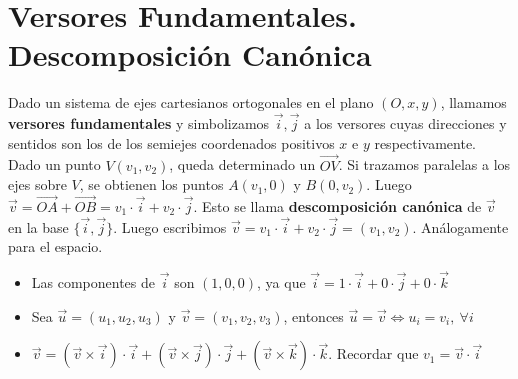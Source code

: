 \documentclass[11pt,a4paper]{article}
\begin{document}
\section{Versores Fundamentales. Descomposici\'on Can\'onica}
\noindent Dado un sistema de ejes cartesianos ortogonales en el plano $(O,x,y)$, llamamos \textbf{versores fundamentales} y simbolizamos $\overrightarrow{i}, \overrightarrow{j}$ a los versores cuyas direcciones y sentidos son los de los semiejes coordenados positivos $x$ e $y$ respectivamente. Dado un punto $V(v_1, v_2)$, queda determinado un $\overrightarrow{OV}$. Si trazamos paralelas a los ejes sobre $V$, se obtienen los puntos $A(v_1, 0)$ y $B(0,v_2)$. Luego $\overrightarrow{v}=\overrightarrow{OA} + \overrightarrow{OB} = v_1 \cdot \overrightarrow{i} + v_2 \cdot \overrightarrow{j}$. Esto se llama \textbf{descomposici\'on can\'onica} de $\overrightarrow{v}$ en la base $\{\overrightarrow{i}, \overrightarrow{j}\}$. Luego escribimos $\overrightarrow{v} = v_1 \cdot \overrightarrow{i} + v_2 \cdot \overrightarrow{j} = (v_1, v_2)$. An\'alogamente para el espacio.
\begin{itemize}
\item Las componentes de $\overrightarrow{i}$ son $(1,0,0)$, ya que $\overrightarrow{i} = 1 \cdot \overrightarrow{i} + 0 \cdot \overrightarrow{j} + 0 \cdot \overrightarrow{k}$
\item Sea $\overrightarrow{u} = (u_1,u_2,u_3)$ y $\overrightarrow{v}=(v_1,v_2,v_3)$, entonces $\overrightarrow{u} = \overrightarrow{v} \iff u_i = v_i,\ \forall i$
\item $\overrightarrow{v} = (\overrightarrow{v}\times\overrightarrow{i}) \cdot \overrightarrow{i} + (\overrightarrow{v}\times\overrightarrow{j})\cdot\overrightarrow{j} + (\overrightarrow{v}\times\overrightarrow{k})\cdot \overrightarrow{k}$. Recordar que $v_1 = \overrightarrow{v} \cdot \overrightarrow{i}$
\end{itemize}
\end{document}

